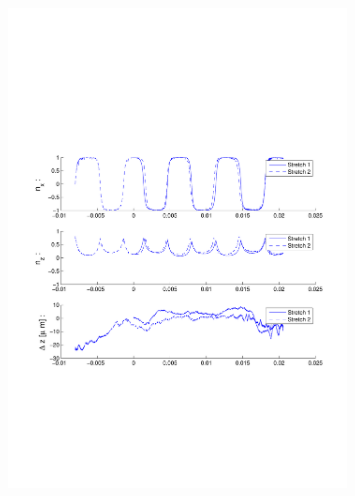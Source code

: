 \begin{figure}[H]

\centering

\includegraphics[width=0.8\textwidth]{Images/Particle 15/Stretch1.pdf}

\end{figure}

